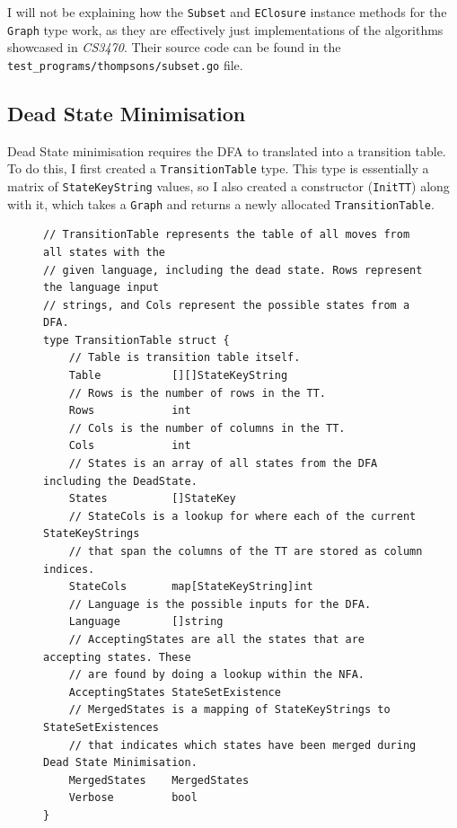 \documentclass[]{full}
\theoremstyle{definition}
\begin{document}
I will not be explaining how the \verb|Subset| and \verb|EClosure| instance methods for the \verb|Graph| type work, as they are effectively just implementations of the algorithms showcased in \textit{CS3470}. Their source code can be found in the \verb|test_programs/thompsons/subset.go| file.

\subsection{Dead State Minimisation}

Dead State minimisation requires the DFA to translated into a transition table. To do this, I first created a \verb|TransitionTable| type. This type is essentially a matrix of \verb|StateKeyString| values, so I also created a constructor (\verb|InitTT|) along with it, which takes a \verb|Graph| and returns a newly allocated \verb|TransitionTable|.

\begin{figure}[H]    
    \begin{verbatim}
// TransitionTable represents the table of all moves from all states with the
// given language, including the dead state. Rows represent the language input
// strings, and Cols represent the possible states from a DFA.
type TransitionTable struct {
    // Table is transition table itself.
    Table           [][]StateKeyString
    // Rows is the number of rows in the TT.
    Rows            int
    // Cols is the number of columns in the TT.
    Cols            int
    // States is an array of all states from the DFA including the DeadState.
    States          []StateKey
    // StateCols is a lookup for where each of the current StateKeyStrings 
    // that span the columns of the TT are stored as column indices.
    StateCols       map[StateKeyString]int
    // Language is the possible inputs for the DFA.
    Language        []string
    // AcceptingStates are all the states that are accepting states. These 
    // are found by doing a lookup within the NFA.
    AcceptingStates StateSetExistence
    // MergedStates is a mapping of StateKeyStrings to StateSetExistences 
    // that indicates which states have been merged during Dead State Minimisation.
    MergedStates    MergedStates
    Verbose         bool
}
    \end{verbatim}
\end{figure}
\end{document}
